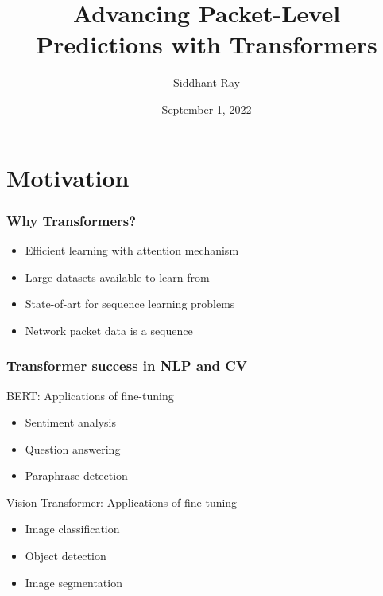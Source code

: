 \documentclass{beamer}
\title[Master Thesis] %
{Advancing Packet-Level Predictions with Transformers}
\date{September 1, 2022}
\author[Siddhant Ray] %
{Siddhant Ray}
\institute[ETH Zürich] %
{
  Dept. of Information Technology and Electrical Engineering(D-ITET) \\
  ETH Zürich
}
\begin{document}
\frame{\titlepage}


%


\section{Motivation}

\begin{frame}
\frametitle{Why Transformers?}
\pause
\begin{itemize}
    \item<1-> Efficient learning with attention mechanism
    \item<1-> Large datasets available to learn from
    \pause
    \item<2-> State-of-art for sequence learning problems
     \item<2-> Network packet data is a sequence
\end{itemize}
\end{frame}


\begin{frame}
\frametitle{Transformer success in NLP and CV}
\pause

BERT: Applications of fine-tuning 

\begin{itemize}  
    \item<1-> Sentiment analysis
    \item<1-> Question answering
    \item<1-> Paraphrase detection
\end{itemize}
\pause

Vision Transformer: Applications of fine-tuning 

\begin{itemize}  
    \item<1-> Image classification
    \item<1-> Object detection
    \item<1-> Image segmentation
\end{itemize}



\end{frame}
\end{document}
